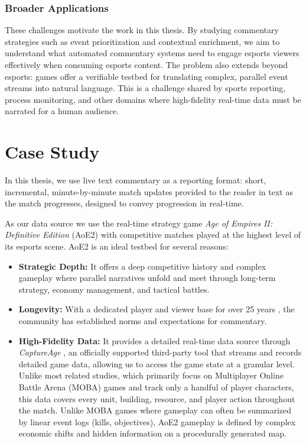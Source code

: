 \subsubsection{Broader Applications}
These challenges motivate the work in this thesis. By studying commentary strategies such as event prioritization and contextual enrichment, we aim to understand what automated commentary systems need to engage esports viewers effectively when consuming esports content. The problem also extends beyond esports: games offer a verifiable testbed for translating complex, parallel event streams into natural language. This is a challenge shared by sports reporting, process monitoring, and other domains where high-fidelity real-time data must be narrated for a human audience.

\section{Case Study}
In this thesis, we use live text commentary \cite{pavzanin2022, lewandowski2012} as a reporting format: short, incremental, minute-by-minute match updates provided to the reader in text as the match progresses, designed to convey progression in real-time. 

As our data source we use the real-time strategy game \textit{Age of Empires II: Definitive Edition} (AoE2) \cite{Microsoft} with competitive matches played at the highest level of its esports scene. AoE2 is an ideal testbed for several reasons:
\begin{itemize}
  \item \textbf{Strategic Depth:} It offers a deep competitive history and complex gameplay where parallel narratives unfold and meet through long-term strategy, economy management, and tactical battles.
  \item \textbf{Longevity:} With a dedicated player and viewer base for over 25 years \cite{SullyGnome}, the community has established norms and expectations for commentary.
  \item \textbf{High-Fidelity Data:} It provides a detailed real-time data source through \textit{CaptureAge} \cite{CaptureAge}, an officially supported third-party tool that streams and records detailed game data, allowing us to access the game state at a granular level. Unlike most related studies, which primarily focus on Multiplayer Online Battle Arena (MOBA) games and track only a handful of player characters, this data covers every unit, building, resource, and player action throughout the match. Unlike MOBA games where gameplay can often be summarized by linear event logs (kills, objectives), AoE2 gameplay is defined by complex economic shifts and hidden information on a procedurally generated map.
\end{itemize}


